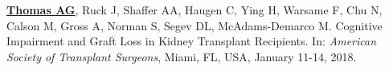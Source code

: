 \documentclass[10pt]{article}
\begin{document}
\begin{bibenum}

%




\item \underline{\textbf{Thomas AG}}, Ruck J, Shaffer AA, Haugen C,
  Ying H, Warsame F, Chu N, Calson M, Gross A, Norman S, Segev DL,
  McAdams-Demarco M. Cognitive Impairment and Graft Loss in
  Kidney Transplant Recipients.
  In: \emph{American Society of Transplant Surgeons},
  Miami, FL, USA, January 11-14, 2018.


\end{bibenum}
\end{document}

